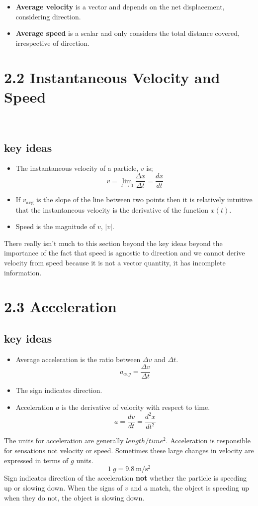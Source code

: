 \documentclass{article}
\begin{document}
\begin{itemize}
    \item \textbf{Average velocity} is a vector and depends on the net displacement, considering direction.
    \item \textbf{Average speed} is a scalar and only considers the total distance covered, irrespective of direction.
\end{itemize}

\section*{2.2 Instantaneous Velocity and Speed}\
\subsection*{key ideas}
\begin{itemize}
	\item The instantaneous velocity of a particle, $v$ is;
		\[
			v = \lim_{t \to 0} \frac{\Delta x}{\Delta t} = \frac{dx}{dt}
		\]
	\item If $v_{\text{avg}}$ is the slope of the line between two points then it is relatively intuitive that the instantaneous velocity is the derivative of the function $x(t)$.
	\item Speed is the magnitude of $v$, $|v|$.
\end{itemize}

There really isn't much to this section beyond the key ideas beyond the importance of the fact that speed is agnostic to direction and we cannot derive velocity from speed because it is not a vector quantity, it has incomplete information.

\section*{2.3 Acceleration}
\subsection*{key ideas}
\begin{itemize}
	\item Average acceleration is the ratio between $\Delta v$ and $\Delta t$.
	\[
		a_{avg} = \frac{\Delta v}{\Delta t}
	\]
	\item The sign indicates direction.
	\item Acceleration $a$ is the derivative of velocity with respect to time.
	\[
		a = \frac{dv}{dt} = \frac{d^2x}{dt^2}
	\]
\end{itemize}
The units for acceleration are generally $length / time^2$. Acceleration is responsible for sensations not velocity or speed.
Sometimes these large changes in velocity are expressed in terms of $g$ units.
\[
	1\ g = 9.8\ \unit{\meter\per\second^2}
\]
Sign indicates direction of the acceleration \textbf{not} whether the particle is speeding up or slowing down.
When the signs of $v$ and $a$ match, the object is speeding up when they do not, the object is slowing down.
\end{document}
